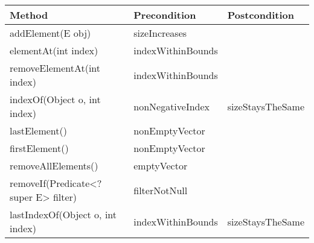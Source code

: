 \documentclass[a4paper]{article}
\begin{document}
	\begin{table}[h]
	\begin{tabular}{|l|l|l|}
	\hline
	\textbf{Method}                      & \textbf{Precondition}        & \textbf{Postcondition} \\ \hline
	addElement(E obj)                         & sizeIncreases           &                        \\ \hline
	elementAt(int index)                      & indexWithinBounds                 &                        \\ \hline
	removeElementAt(int index)         & indexWithinBounds                 &       \\ \hline
	indexOf(Object o, int index)          &  nonNegativeIndex      & sizeStaysTheSame   \\ \hline
	lastElement()    							  & nonEmptyVector         &                                    \\ \hline
	firstElement()             				  & nonEmptyVector         &                         		      \\ \hline
	removeAllElements()                             & emptyVector                    &                        \\ \hline
	removeIf(Predicate<? super E> filter)          & filterNotNull &                                    \\ \hline
	lastIndexOf(Object o, int index)               & indexWithinBounds    &      sizeStaysTheSame   \\ \hline
\end{tabular}
\end{table}
\end{document}
